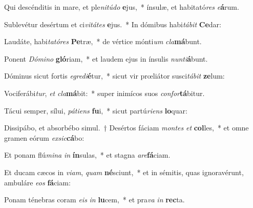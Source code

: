 \item Qui descénditis in mare, et ple\textit{ni}\textit{tú}\textit{do} \textbf{e}jus,~* ínsulæ, et habitató\textit{res} \textit{e}\textbf{á}rum.
\item Sublevétur desértum et ci\textit{vi}\textit{tá}\textit{tes} \textbf{e}jus.~* In dómibus habi\textit{tá}\textit{bit} \textbf{Ce}dar:
\item Laudáte, habi\textit{ta}\textit{tó}\textit{res} \textbf{Pe}træ,~* de vértice mónti\textit{um} \textit{cla}\textbf{má}bunt.
\item Ponent \textit{Dó}\textit{mi}\textit{no} \textbf{gló}riam,~* et laudem ejus in ínsulis \textit{nun}\textit{ti}\textbf{á}bunt.
\item Dóminus sicut fortis \textit{e}\textit{gre}\textit{di}\textbf{é}tur,~* sicut vir prœliátor susci\textit{tá}\textit{bit} \textbf{ze}lum:
\item Vociferábi\textit{tur}, \textit{et} \textit{cla}\textbf{má}bit:~* super inimícos suos \textit{con}\textit{for}\textbf{tá}bitur.
\item Tácui semper, sílui, \textit{pá}\textit{ti}\textit{ens} \textbf{fu}i,~* sicut partú\textit{ri}\textit{ens} \textbf{lo}quar:
\item Dissipábo, et absorbébo simul.~† Desértos fáciam \textit{mon}\textit{tes} \textit{et} \textbf{col}les,~* et omne gramen eórum \textit{ex}\textit{sic}\textbf{cá}bo:
\item Et ponam flú\textit{mi}\textit{na} \textit{in} \textbf{ín}sulas,~* et stagna \textit{a}\textit{re}\textbf{fá}ciam.
\item Et ducam cæcos in \textit{vi}\textit{am}, \textit{quam} \textbf{né}sciunt,~* et in sémitis, quas ignoravérunt, ambuláre \textit{e}\textit{os} \textbf{fá}ciam:
\item Ponam ténebras coram \textit{e}\textit{is} \textit{in} \textbf{lu}cem,~* et pra\textit{va} \textit{in} \textbf{rec}ta.
